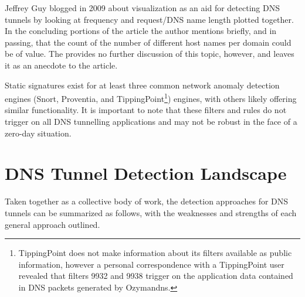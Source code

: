 \documentclass[12pt]{report}
\theoremstyle{remark}
\theoremstyle{definition}
\theoremstyle{definition}
\theoremstyle{definition}
\begin{document}
Jeffrey Guy\cite{Guy2009} blogged in 2009 about visualization as an aid for detecting DNS
tunnels by looking at frequency and request/DNS name length plotted together. In
the concluding portions of the article the author mentions briefly, and in
passing, that the count of the number of different host names per domain could
be of value. The provides no further discussion of this topic, however, and
leaves it as an anecdote to the article.

Static signatures exist for at least three common network anomaly detection
engines (Snort\cite{Chamberland2009.snort_iodine},
Proventia\cite{Proventia2013.ips_tunnel}, and TippingPoint\footnote{TippingPoint
does not make information about its filters available as public information,
however a personal correspondence with a TippingPoint user revealed that filters 9932 and
9938 trigger on the application data contained in DNS packets generated by
Ozymandns.}) engines, with others likely offering similar functionality. It is
important to note that these filters and rules do not trigger on all DNS
tunnelling applications and may not be robust in the face of a zero-day
situation.

\section{DNS Tunnel Detection Landscape}
\label{litsummary}
Taken together as a collective body of work, the detection approaches for DNS
tunnels can be summarized as follows, with the weaknesses and strengths of each general approach outlined.
\end{document}

